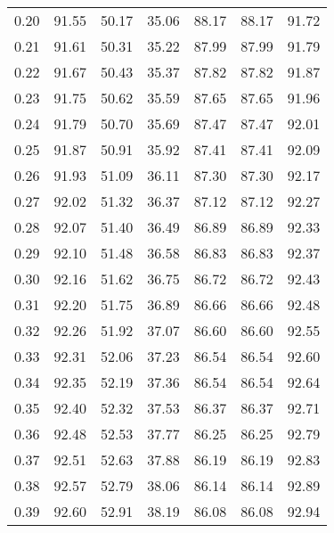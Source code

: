 \begin{tabular}{|c|c|c|c|c|c|c|}
      0.20 &     91.55 &     50.17 &      35.06 &   88.17 &      88.17 &         91.72 \\
      0.21 &     91.61 &     50.31 &      35.22 &   87.99 &      87.99 &         91.79 \\
      0.22 &     91.67 &     50.43 &      35.37 &   87.82 &      87.82 &         91.87 \\
      0.23 &     91.75 &     50.62 &      35.59 &   87.65 &      87.65 &         91.96 \\
      0.24 &     91.79 &     50.70 &      35.69 &   87.47 &      87.47 &         92.01 \\
      0.25 &     91.87 &     50.91 &      35.92 &   87.41 &      87.41 &         92.09 \\
      0.26 &     91.93 &     51.09 &      36.11 &   87.30 &      87.30 &         92.17 \\
      0.27 &     92.02 &     51.32 &      36.37 &   87.12 &      87.12 &         92.27 \\
      0.28 &     92.07 &     51.40 &      36.49 &   86.89 &      86.89 &         92.33 \\
      0.29 &     92.10 &     51.48 &      36.58 &   86.83 &      86.83 &         92.37 \\
      0.30 &     92.16 &     51.62 &      36.75 &   86.72 &      86.72 &         92.43 \\
      0.31 &     92.20 &     51.75 &      36.89 &   86.66 &      86.66 &         92.48 \\
      0.32 &     92.26 &     51.92 &      37.07 &   86.60 &      86.60 &         92.55 \\
      0.33 &     92.31 &     52.06 &      37.23 &   86.54 &      86.54 &         92.60 \\
      0.34 &     92.35 &     52.19 &      37.36 &   86.54 &      86.54 &         92.64 \\
      0.35 &     92.40 &     52.32 &      37.53 &   86.37 &      86.37 &         92.71 \\
      0.36 &     92.48 &     52.53 &      37.77 &   86.25 &      86.25 &         92.79 \\
      0.37 &     92.51 &     52.63 &      37.88 &   86.19 &      86.19 &         92.83 \\
      0.38 &     92.57 &     52.79 &      38.06 &   86.14 &      86.14 &         92.89 \\
      0.39 &     92.60 &     52.91 &      38.19 &   86.08 &      86.08 &         92.94 \\

\end{tabular}
